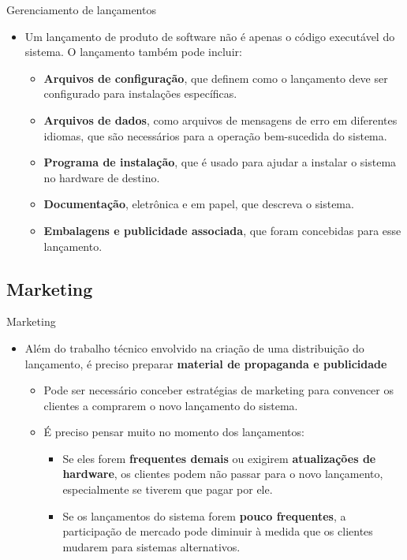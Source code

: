 \documentclass{beamer}
\begin{document}
\begin{frame}{Gerenciamento de lançamentos}
	\begin{itemize}
		\justifying
		\item Um lançamento de produto de software não é apenas o código executável do sistema. O lançamento também pode incluir:
		\begin{itemize}
			\justifying
			\item<2-> \textbf{Arquivos de configuração}, que definem como o lançamento deve ser configurado para instalações específicas.
			\item<3-> \textbf{Arquivos de dados}, como arquivos de mensagens de erro em diferentes idiomas, que são necessários para a operação bem-sucedida do sistema.
			\item<4-> \textbf{Programa de instalação}, que é usado para ajudar a instalar o sistema no hardware de destino.
			\item<5-> \textbf{Documentação}, eletrônica e em papel, que descreva o sistema.
			\item<6> \textbf{Embalagens e publicidade associada}, que foram concebidas para esse lançamento.
		\end{itemize}
	\end{itemize}
\end{frame}

\subsection{Marketing}

\begin{frame}{Marketing}
	\begin{itemize}
		\justifying
		\item Além do trabalho técnico envolvido na criação de uma distribuição do lançamento, é preciso preparar \textbf{material de propaganda e publicidade}
		\begin{itemize}
			\justifying
			\item<2-> Pode ser necessário conceber estratégias de marketing para convencer os clientes a comprarem o novo lançamento do sistema.
			\item<3-> É preciso pensar muito no momento dos lançamentos:
			\begin{itemize}
				\justifying
				\item<4> Se eles forem \textbf{frequentes demais} ou exigirem \textbf{atualizações de hardware}, os clientes podem não passar para o novo lançamento, especialmente se tiverem que pagar por ele.
				\item<4> Se os lançamentos do sistema forem \textbf{pouco frequentes}, a participação de mercado pode diminuir à medida que os clientes mudarem para sistemas alternativos.
			\end{itemize}
		\end{itemize}
	\end{itemize}
\end{frame}
\end{document}
